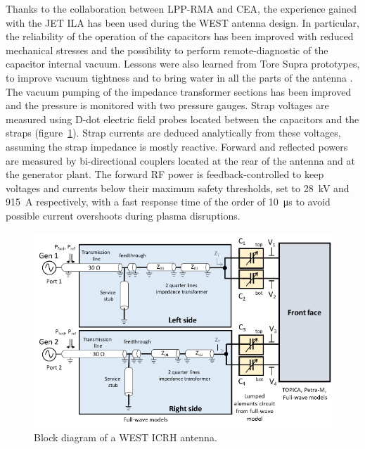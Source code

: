\documentclass[12p]{iopart}
\begin{document}
Thanks to the collaboration between LPP-RMA and CEA, the experience gained with the JET ILA \cite{durodie2012-1} has been used during the WEST antenna design. In particular, the reliability of the operation of the capacitors has been improved with reduced mechanical stresses and the possibility to perform remote-diagnostic of the capacitor internal vacuum. Lessons were also learned from Tore Supra prototypes, to improve vacuum tightness and to bring water in all the parts of the antenna \cite{vulliez2008, vulliez2015}. The vacuum pumping of the impedance transformer sections has been improved and the pressure is monitored with two pressure gauges. Strap voltages are measured using D-dot electric field probes located between the capacitors and the straps (figure~\ref{fig:westicrhblockdiagram}). Strap currents are deduced analytically from these voltages, assuming the strap impedance is mostly reactive. Forward and reflected powers are measured by bi-directional couplers located at the rear of the antenna and at the generator plant. The forward RF power is feedback-controlled to keep voltages and currents below their maximum safety thresholds, set to \SI{28}{\kilo\volt} and \SI{915}{\ampere} respectively, with a fast response time of the order of \SI{10}{\micro\second}  to avoid possible current overshoots during plasma disruptions.

\begin{figure}
	\centering
	\includegraphics[width=0.95\linewidth]{figures/WEST_ICRH_block_diagram}
	\caption{Block diagram of a WEST ICRH antenna.}
	\label{fig:westicrhblockdiagram}
\end{figure}
\end{document}
